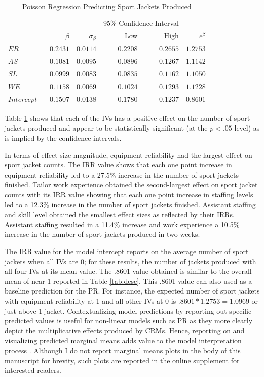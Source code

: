 \documentclass[man]{apa7}
\begin{document}
	\begin{table}[h!]
		\centering
		\caption{\centering Poisson Regression Predicting Sport Jackets Produced} 
		\begin{tabular}{l|rrrrr}
			\hline %
			\multicolumn{1}{l}{} &  &  & \multicolumn{2}{c}{95\% Confidence Interval} &   \\ 
			\multicolumn{1}{l}{} & $\beta$ & $\sigma_{\beta}$ & Low & High & $e^{\beta}$ \\ 
			\hline %
			$ER$ & $0.2431$ & $0.0114$ & $0.2208$ & $0.2655$ & $1.2753$ \\  
			$AS$ & $0.1081$ & $0.0095$ & $0.0896$ & $0.1267$ & $1.1142$ \\ 
			$SL$ & $0.0999$ & $0.0083$ & $0.0835$ & $0.1162$ & $1.1050$ \\
			$WE$ & $0.1158$ & $0.0069$ & $0.1024$ & $0.1293$ & $1.1228$ \\ 
			$Intercept$ & $-0.1507$ & $0.0138$ & $-0.1780$ & $-0.1237$ & $0.8601$ \\
			\hline %
		\end{tabular}
		\label{tab:poisreg}
	\end{table}

	Table \ref{tab:poisreg} shows that each of the IVs has a positive effect on the number of sport jackets produced and appear to be statistically significant (at the $p < .05$ level) as is implied by the confidence intervals.
	
	In terms of effect size magnitude, equipment reliability had the largest effect on sport jacket counts. 
	The IRR value shows that each one point increase in equipment reliability led to a 27.5\% increase in the number of sport jackets finished.
	Tailor work experience obtained the second-largest effect on sport jacket counts with its IRR value showing that each one point increase in staffing levels led to a 12.3\% increase in the number of sport jackets finished.
	Assistant staffing and skill level obtained the smallest effect sizes as reflected by their IRRs.
	Assistant staffing resulted in a 11.4\% increase and work experience a 10.5\% increase in the number of sport jackets produced in two weeks. 
	
	The IRR value for the model intercept reports on the average number of sport jackets when all IVs are 0; for these results, the number of jackets produced with all four IVs at its mean value. 
	The .8601 value obtained is similar to the overall mean of near 1 reported in Table \ref{tab:desc}.
	This .8601 value can also used as a baseline prediction for the PR.
	For instance, the expected number of sport jackets with equipment reliability at 1 and all other IVs at 0 is $.8601*1.2753 = 1.0969$ or just above 1 jacket.
	Contextualizing model predictions by reporting out specific predicted values is useful for non-linear models such as PR as they more clearly depict the multiplicative effects produced by CRMs.
	Hence, reporting on and visualizing predicted marginal means adds value to the model interpretation process \parencite[see][for a similar perspective]{ronkko2022eight}.
	Although I do not report marginal means plots in the body of this manuscript for brevity, such plots are reported in the online supplement for interested readers.
	
\end{document}
